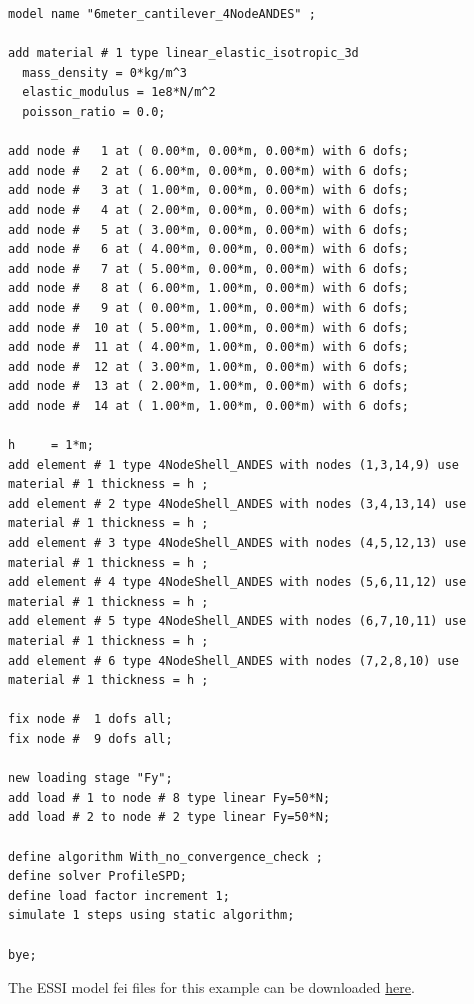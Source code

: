 \documentclass[fleqn,11pt]{article}
\begin{document}
%
\begin{lstlisting}
model name "6meter_cantilever_4NodeANDES" ;

add material # 1 type linear_elastic_isotropic_3d
  mass_density = 0*kg/m^3
  elastic_modulus = 1e8*N/m^2
  poisson_ratio = 0.0;

add node #   1 at ( 0.00*m, 0.00*m, 0.00*m) with 6 dofs;
add node #   2 at ( 6.00*m, 0.00*m, 0.00*m) with 6 dofs;
add node #   3 at ( 1.00*m, 0.00*m, 0.00*m) with 6 dofs;
add node #   4 at ( 2.00*m, 0.00*m, 0.00*m) with 6 dofs;
add node #   5 at ( 3.00*m, 0.00*m, 0.00*m) with 6 dofs;
add node #   6 at ( 4.00*m, 0.00*m, 0.00*m) with 6 dofs;
add node #   7 at ( 5.00*m, 0.00*m, 0.00*m) with 6 dofs;
add node #   8 at ( 6.00*m, 1.00*m, 0.00*m) with 6 dofs;
add node #   9 at ( 0.00*m, 1.00*m, 0.00*m) with 6 dofs;
add node #  10 at ( 5.00*m, 1.00*m, 0.00*m) with 6 dofs;
add node #  11 at ( 4.00*m, 1.00*m, 0.00*m) with 6 dofs;
add node #  12 at ( 3.00*m, 1.00*m, 0.00*m) with 6 dofs;
add node #  13 at ( 2.00*m, 1.00*m, 0.00*m) with 6 dofs;
add node #  14 at ( 1.00*m, 1.00*m, 0.00*m) with 6 dofs;

h     = 1*m;  
add element # 1 type 4NodeShell_ANDES with nodes (1,3,14,9) use material # 1 thickness = h ; 
add element # 2 type 4NodeShell_ANDES with nodes (3,4,13,14) use material # 1 thickness = h ; 
add element # 3 type 4NodeShell_ANDES with nodes (4,5,12,13) use material # 1 thickness = h ; 
add element # 4 type 4NodeShell_ANDES with nodes (5,6,11,12) use material # 1 thickness = h ; 
add element # 5 type 4NodeShell_ANDES with nodes (6,7,10,11) use material # 1 thickness = h ; 
add element # 6 type 4NodeShell_ANDES with nodes (7,2,8,10) use material # 1 thickness = h ; 

fix node #  1 dofs all;
fix node #  9 dofs all;

new loading stage "Fy";
add load # 1 to node # 8 type linear Fy=50*N;
add load # 2 to node # 2 type linear Fy=50*N;

define algorithm With_no_convergence_check ;
define solver ProfileSPD;
define load factor increment 1;
simulate 1 steps using static algorithm;

bye;
\end{lstlisting}


The ESSI model fei files for this example can be downloaded 
\href{https://github.com/BorisJeremic/Real-ESSI-Examples/blob/master/model_fei_file/ANDESshell_cantilever_inplane/ANDESshell_cantilever_inplane.tgz?raw=true}{here}.
\end{document}
